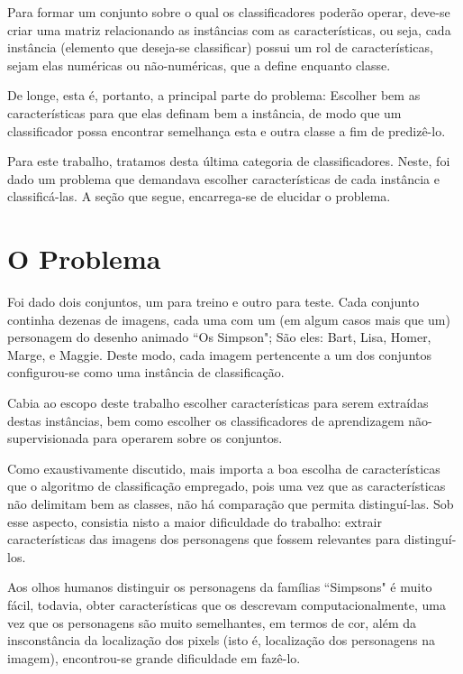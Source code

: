 \documentclass[12pt]{article}
\begin{document}
	Para formar um conjunto sobre o qual os classificadores poderão operar, deve-se criar uma matriz relacionando as instâncias com as características, ou seja, cada instância (elemento que deseja-se classificar) possui um rol de características, sejam elas numéricas ou não-numéricas, que a define enquanto classe.

	De longe, esta é, portanto, a principal parte do problema: Escolher bem as características para que elas definam bem a instância, de modo que um classificador possa encontrar semelhança esta e outra classe a fim de predizê-lo.

	Para este trabalho, tratamos desta última categoria de classificadores. Neste, foi dado um problema que demandava escolher características de cada instância e classificá-las. A seção que segue, encarrega-se de elucidar o problema.

\section{O Problema}\label{sec:problema}

	Foi dado dois conjuntos, um para treino e outro para teste. Cada conjunto continha dezenas de imagens, cada uma com um (em algum casos mais que um) personagem do desenho animado ``Os Simpson"; São eles: Bart, Lisa, Homer, Marge, e Maggie. Deste modo, cada imagem pertencente a um dos conjuntos configurou-se como uma instância de classificação.

	Cabia ao escopo deste trabalho escolher características para serem extraídas destas instâncias, bem como escolher os classificadores de aprendizagem não-supervisionada para operarem sobre os conjuntos.

	Como exaustivamente discutido, mais importa a boa escolha de características que o algoritmo de classificação empregado, pois uma vez que as características não delimitam bem as classes, não há comparação que permita distinguí-las. Sob esse aspecto, consistia nisto a maior dificuldade do trabalho: extrair características das imagens dos personagens que fossem relevantes para distinguí-los.

	Aos olhos humanos distinguir os personagens da famílias ``Simpsons" é muito fácil, todavia, obter características que os descrevam computacionalmente, uma vez que os personagens são muito semelhantes, em termos de cor, além da insconstância da localização dos pixels (isto é, localização dos personagens na imagem), encontrou-se grande dificuldade em fazê-lo.
\end{document}
